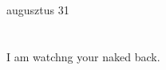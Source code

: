 \documentclass[11pt,letterpaper]{article}
\begin{document}
\logoPNG

{\Huge augusztus 31}

\section*{ }


I am watchng your naked back.
\end{document}
